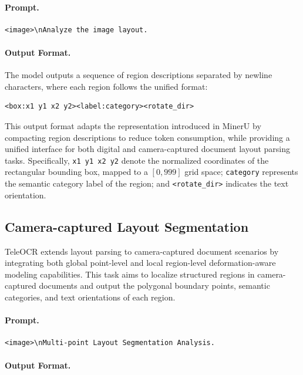 \documentclass{fairmeta}
\begin{document}
\paragraph{Prompt.}
\begin{verbatim}
<image>\nAnalyze the image layout.
\end{verbatim}

\paragraph{Output Format.}

The model outputs a sequence of region descriptions separated by newline characters, where each region follows the unified format:

\begin{verbatim}
<box:x1 y1 x2 y2><label:category><rotate_dir>
\end{verbatim}

This output format adapts the representation introduced in MinerU by compacting region descriptions to reduce token consumption, while providing a unified interface for both digital and camera-captured document layout parsing tasks. Specifically, \texttt{x1 y1 x2 y2} denote the normalized coordinates of the rectangular bounding box, mapped to a $[0,999]$ grid space; \texttt{category} represents the semantic category label of the region; and \texttt{<rotate\_dir>} indicates the text orientation.

\subsection{Camera-captured Layout Segmentation}
\label{app:Camera_captured_Layout_Segmentation}
TeleOCR extends layout parsing to camera-captured document scenarios by integrating both global point-level and local region-level deformation-aware modeling capabilities. This task aims to localize structured regions in camera-captured documents and output the polygonal boundary points, semantic categories, and text orientations of each region.

\paragraph{Prompt.}
\begin{verbatim}
<image>\nMulti-point Layout Segmentation Analysis.
\end{verbatim}

\paragraph{Output Format.}
\end{document}
